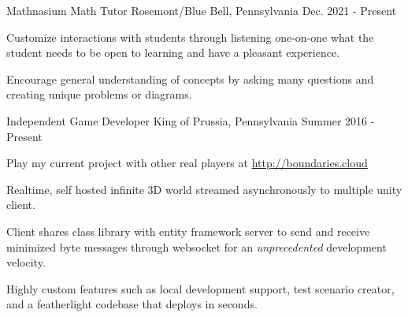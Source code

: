 

\begin{cventries}

  \cventry
    {Mathnasium} %
    {Math Tutor} %
    {Rosemont/Blue Bell, Pennsylvania} %
    {Dec. 2021 - Present} %
    {
      \begin{cvitems} %
        \item {Customize interactions with students through listening one-on-one what the student needs to be open to learning and have a pleasant experience.}
        \item {Encourage general understanding of concepts by asking many questions and creating unique problems or diagrams.}
      \end{cvitems}
    }

  \cventry
    {Independent} %
    {Game Developer} %
    {King of Prussia, Pennsylvania} %
    {Summer 2016 - Present} %
    {
      \begin{cvitems} %
        \item {Play my current project with other real players at \url{http://boundaries.cloud}}
        \item {Realtime, self hosted infinite 3D world streamed asynchronously to multiple unity client.}
        \item {Client shares class library with entity framework server to send and receive minimized byte messages through websocket for an \emph{unprecedented} development velocity.}
        \item {Highly custom features such as local development support, test scenario creator, and a featherlight codebase that deploys in seconds.}
      \end{cvitems}
    }


\end{cventries}
